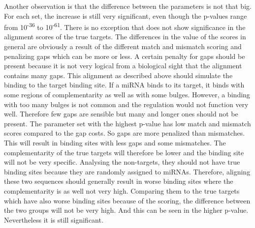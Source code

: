 \documentclass[11pt,  a4paper]{report}
\begin{document}
Another observation is that the difference between the parameters is not that big. For each set, the increase is still very significant, even though the p-values range from 10\textsuperscript{-36} to 10\textsuperscript{-61}. There is no exception that does not show significance in the alignment scores of the true targets. The differences in the value of the scores in general are obviously a result of the different match and mismatch scoring and penalizing gaps which can be more or less. A certain penalty for gaps should be present because it is not very logical from a biological sight that the alignment contains many gaps. This alignment as described above should simulate the binding to the target binding site. If a miRNA binds to its target, it binds with some regions of complementarity as well as with some bulges. However, a binding with too many bulges is not common and the regulation would not function very well. Therefore few gaps are sensible but many and longer ones should not be present.
The parameter set with the highest p-value has low match and mismatch scores compared to the gap costs. So gaps are more penalized than mismatches. This will result in binding sites with less gaps and some mismatches. The complementarity of the true targets will therefore be lower and the binding site will not be very specific. Analysing the non-targets, they should not have true binding sites because they are randomly assigned to miRNAs. Therefore, aligning these two sequences should generally result in worse binding sites where the complementarity is as well not very high. Comparing them to the true targets which have also worse binding sites because of the scoring, the difference between the two groups will not be very high. And this can be seen in the higher p-value. Nevertheless it is still significant. \\
\end{document}
